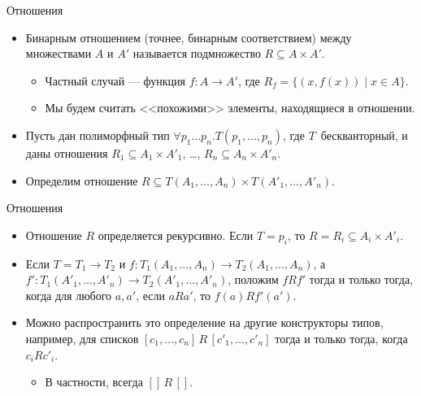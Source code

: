 \documentclass[xcolor=dvipsnames]{beamer}
\begin{document}
\begin{frame}{Отношения}
 
 \begin{itemize}[<+->]
  \item Бинарным отношением (точнее, бинарным соответствием) между множествами $A$ и $A'$ называется подмножество $R \subseteq A \times A'$.
  \begin{itemize}
   \item Частный случай --- функция $f \colon A \to A'$, где $R_f = \{ (x,f(x)) \mid x \in A \}$.
   \item Мы будем считать <<похожими>> элементы, находящиеся в отношении.
  \end{itemize}
  \item Пусть дан полиморфный тип $\forall p_1 \ldots p_n . T(p_1, \ldots, p_n)$, где $T$~бескванторный, и даны отношения $R_1 \subseteq A_1 \times A'_1$, \ldots, 
  $R_n \subseteq A_n \times A'_n$.
  \item Определим отношение $R \subseteq T(A_1, \ldots, A_n) \times T(A'_1, \ldots, A'_n)$.
 \end{itemize}

 
\end{frame}

\begin{frame}{Отношения}
 
 \begin{itemize}[<+->]
  \item Отношение $R$ определяется рекурсивно. Если $T = p_i$, то $R = R_i \subseteq A_i \times A'_i$.
  \item Если $T = T_1 \to T_2$ и $f \colon T_1(A_1, \ldots, A_n) \to T_2(A_1, \ldots, A_n)$, а $f' \colon T_1(A'_1, \ldots, A'_n) \to T_2(A'_1, \ldots, A'_n)$, положим
  $f R f'$ тогда и только тогда, когда для любого $a, a'$, если $a R a'$, то $f(a) R f'(a')$.
  \item Можно распространить это определение на другие конструкторы типов, например, для списков $[c_1, \ldots, c_n] \, R \, [c'_1, \ldots, c'_n]$ тогда и только тогда, когда $c_i R c'_i$.
  \begin{itemize}
  \item В частности, всегда $[]\, R\, []$.
  \end{itemize}
 \end{itemize}

\end{frame}
\end{document}
